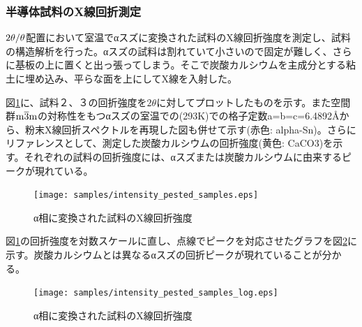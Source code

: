 \subsubsection{半導体試料のX線回折測定}
$\rm 2\theta/\theta$配置において室温でαスズに変換された試料のX線回折強度を測定し、試料の構造解析を行った。αスズの試料は割れていて小さいので固定が難しく、さらに基板の上に置くと出っ張ってしまう。そこで炭酸カルシウムを主成分とする粘土に埋め込み、平らな面を上にしてX線を入射した。

図\ref{fig:intensity_pested_samples}に、試料２、３の回折強度を$2\theta$に対してプロットしたものを示す。また空間群$\rm m\overline{3}m$の対称性をもつαスズの室温での(293K)での格子定数a=b=c=6.4892\AA \cite{THEWLIS}から、粉末X線回折スペクトルを再現した図も併せて示す(赤色: alpha-Sn)。さらにリファレンスとして、測定した炭酸カルシウムの回折強度(黄色: CaCO3)を示す。それぞれの試料の回折強度には、αスズまたは炭酸カルシウムに由来するピークが現れている。
\begin{figure}[!h]
  \begin{center}
  \texttt{[image: samples/intensity\_pested\_samples.eps]}
  \end{center}
  \caption{α相に変換された試料のX線回折強度}
  \label{fig:intensity_pested_samples}
\end{figure}

図\ref{fig:intensity_pested_samples}の回折強度を対数スケールに直し、点線でピークを対応させたグラフを図\ref{fig:intensity_pested_samples_log}に示す。炭酸カルシウムとは異なるαスズの回折ピークが現れていることが分かる。%
\begin{figure}[!h]
  \begin{center}
  \texttt{[image: samples/intensity\_pested\_samples\_log.eps]}
  \end{center}
  \caption{α相に変換された試料のX線回折強度}
  \label{fig:intensity_pested_samples_log}
\end{figure}




